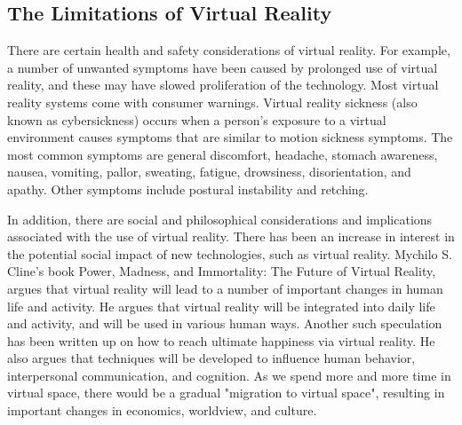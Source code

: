 \documentclass[preprint,12pt]{elsarticle}
\begin{document}
\subsection{The Limitations of Virtual Reality}
There are certain health and safety considerations of virtual reality. For example, a number of unwanted symptoms have been caused by prolonged use of virtual reality,\cite{kela2006accelerometer} and these may have slowed proliferation of the technology. Most virtual reality systems come with consumer warnings. Virtual reality sickness (also known as cybersickness) occurs when a person's exposure to a virtual environment causes symptoms that are similar to motion sickness symptoms.\cite{kim2009simulated} The most common symptoms are general discomfort, headache, stomach awareness, nausea, vomiting, pallor, sweating, fatigue, drowsiness, disorientation, and apathy.\cite{seungjun2006reliable} Other symptoms include postural instability and retching.


In addition, there are social and philosophical considerations and implications associated with the use of virtual reality. There has been an increase in interest in the potential social impact of new technologies, such as virtual reality. Mychilo S. Cline's book Power, Madness, and Immortality: The Future of Virtual Reality, argues that virtual reality will lead to a number of important changes in human life and activity.\cite{stricker2001augmented} He argues that virtual reality will be integrated into daily life and activity, and will be used in various human ways. Another such speculation has been written up on how to reach ultimate happiness via virtual reality.\cite{kotranza2008virtual} He also argues that techniques will be developed to influence human behavior, interpersonal communication, and cognition. As we spend more and more time in virtual space, there would be a gradual "migration to virtual space", resulting in important changes in economics, worldview, and culture.
\end{document}
